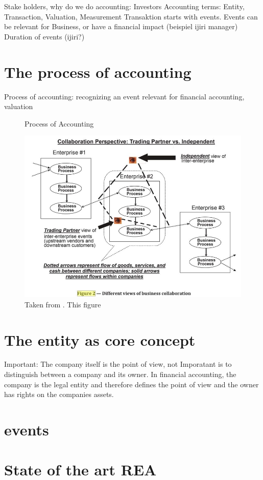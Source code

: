 Stake holders, why do we do accounting: Investors
Accounting terms: Entity, Transaction, Valuation, Measurement
Transaktion starts with events.
Events can be relevant for Business, or have a financial impact (beispiel ijiri manager)
Duration of events (ijiri?)

\section{The process of accounting}
Process of accounting: recognizing an event relevant for financial accounting, valuation

\begin{figure}
	\centering
	\caption{Process of Accounting}
	\label{fig:accounting-process}
	\includegraphics[width=0.7\linewidth]{"../figures/replace/CollaborativePerspective"}
	\caption*{Taken from \cite[p.3]{horngren2006introduction}. This figure }
\end{figure}

\section{The entity as core concept}
Important: The company itself is the point of view, not
Imporatant is to distinguish between a company and its owner. In financial accounting, the company is the legal entity and therefore defines the point of view and the owner has rights on the companies assets.

\section{events}

\section{State of the art REA}
